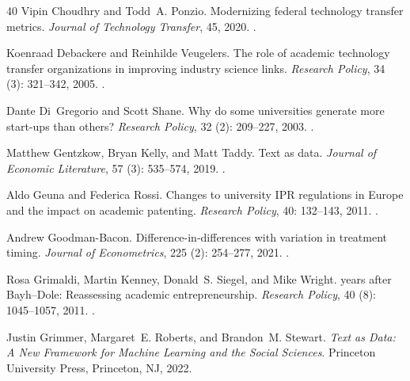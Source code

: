 \begin{thebibliography}{40}
Vipin Choudhry and Todd~A. Ponzio.
\newblock Modernizing federal technology transfer metrics.
\newblock \emph{Journal of Technology Transfer}, 45, 2020.
\newblock {}.

Koenraad Debackere and Reinhilde Veugelers.
\newblock The role of academic technology transfer organizations in improving
  industry science links.
\newblock \emph{Research Policy}, 34 (3): 321--342, 2005.
\newblock {}.

Dante Di~Gregorio and Scott Shane.
\newblock Why do some universities generate more start-ups than others?
\newblock \emph{Research Policy}, 32 (2): 209--227, 2003.
\newblock {}.

Matthew Gentzkow, Bryan Kelly, and Matt Taddy.
\newblock Text as data.
\newblock \emph{Journal of Economic Literature}, 57 (3):
  535--574, 2019.
\newblock {}.

Aldo Geuna and Federica Rossi.
\newblock Changes to university {IPR} regulations in {Europe} and the impact on
  academic patenting.
\newblock \emph{Research Policy}, 40: 132--143, 2011.
\newblock {}.

Andrew Goodman-Bacon.
\newblock Difference-in-differences with variation in treatment timing.
\newblock \emph{Journal of Econometrics}, 225 (2): 254--277,
  2021.
\newblock {}.

Rosa Grimaldi, Martin Kenney, Donald~S. Siegel, and Mike Wright.
 years after {Bayh--Dole}: Reassessing academic entrepreneurship.
\newblock \emph{Research Policy}, 40 (8): 1045--1057, 2011.
\newblock {}.

Justin Grimmer, Margaret~E. Roberts, and Brandon~M. Stewart.
\newblock \emph{Text as Data: A New Framework for Machine Learning and the
  Social Sciences}.
\newblock Princeton University Press, Princeton, NJ, 2022.


\end{thebibliography}
